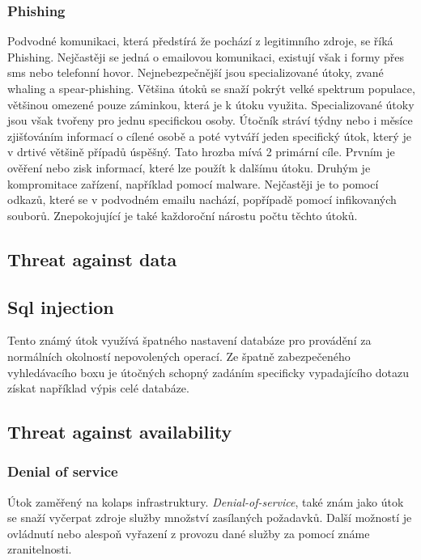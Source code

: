 \subsubsection{Phishing}
Podvodné komunikaci, která předstírá že pochází z legitimního zdroje, se říká Phishing\cite{cisco_most_common_attack}.
Nejčastěji se jedná o emailovou komunikaci, existují však i formy přes sms nebo telefonní hovor.
Nejnebezpečnější jsou specializované útoky, zvané whaling a spear-phishing.
Většina útoků se snaží pokrýt velké spektrum populace, většinou omezené pouze záminkou, která je k útoku využita.
Specializované útoky jsou však tvořeny pro jednu specifickou osoby.
Útočník stráví týdny nebo i měsíce zjišťováním informací o cílené osobě a poté vytváří jeden specifický útok, který je v drtivé většině případů úspěšný.
Tato hrozba mívá 2 primární cíle.
Prvním je ověření nebo zisk informací, které lze použít k dalšímu útoku.
Druhým je kompromitace zařízení, například pomocí malware.
Nejčastěji je to pomocí odkazů, které se v podvodném emailu nachází, popřípadě pomocí infikovaných souborů.
Znepokojující je také každoroční nárostu počtu těchto útoků.\cite{moje_bakalarka}




\subsection{Threat against data}

\subsection{Sql injection}
Tento známý útok využívá špatného nastavení databáze pro provádění za normálních okolností nepovolených operací.
Ze špatně zabezpečeného vyhledávacího boxu je útočných schopný zadáním specificky vypadajícího dotazu získat například výpis celé databáze.

\subsection{Threat against availability}

\subsubsection{Denial of service}
Útok zaměřený na kolaps infrastruktury.
\textit{Denial-of-service}, také znám jako  útok se snaží vyčerpat zdroje služby množství zasílaných požadavků.
Další možností je ovládnutí nebo alespoň vyřazení z provozu dané služby za pomocí známe zranitelnosti.\cite{cisco_most_common_attack}


